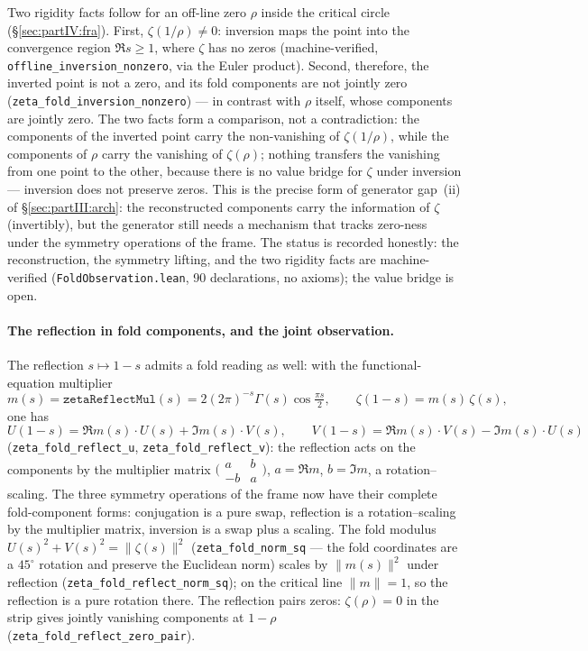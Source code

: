 \documentclass{article}
\newcommand{\zt}{\zeta}
\begin{document}
Two rigidity facts follow for an off-line zero $\rho$ inside the
critical circle (\S\ref{sec:partIV:fra}). First, $\zt(1/\rho)\ne 0$:
inversion maps the point into the convergence region $\Re s\ge1$,
where $\zt$ has no zeros (machine-verified,
\texttt{offline\_inversion\_nonzero}, via the Euler product). Second,
therefore, the inverted point is not a zero, and its fold components
are not jointly zero (\texttt{zeta\_fold\_inversion\_nonzero}) --- in
contrast with $\rho$ itself, whose components are jointly zero. The
two facts form a comparison, not a contradiction: the components of
the inverted point carry the non-vanishing of $\zt(1/\rho)$, while the
components of $\rho$ carry the vanishing of $\zt(\rho)$; nothing
transfers the vanishing from one point to the other, because there is
no value bridge for $\zt$ under inversion --- inversion does not
preserve zeros. This is the precise form of generator gap~(ii) of
\S\ref{sec:partIII:arch}: the reconstructed components carry the
information of $\zt$ (invertibly), but the generator still needs a
mechanism that tracks zero-ness under the symmetry operations of the
frame. The status is recorded honestly: the reconstruction, the
symmetry lifting, and the two rigidity facts are machine-verified
(\texttt{FoldObservation.lean}, 90 declarations, no axioms); the value
bridge is open.

\paragraph{The reflection in fold components, and the joint observation.}
The reflection $s\mapsto 1-s$ admits a fold reading as well: with the
functional-equation multiplier
\begin{equation}
  m(s)=\texttt{zetaReflectMul}(s)=2(2\pi)^{-s}\Gamma(s)\cos\tfrac{\pi s}{2},
  \qquad \zt(1-s)=m(s)\,\zt(s),
\end{equation}
one has
\begin{equation}
  U(1-s)=\Re m(s)\cdot U(s)+\Im m(s)\cdot V(s),\qquad
  V(1-s)=\Re m(s)\cdot V(s)-\Im m(s)\cdot U(s)
\end{equation}
(\texttt{zeta\_fold\_reflect\_u}, \texttt{zeta\_fold\_reflect\_v}): the
reflection acts on the components by the multiplier matrix
$\bigl(\begin{smallmatrix}a&b\\-b&a\end{smallmatrix}\bigr)$, $a=\Re m$,
$b=\Im m$, a rotation--scaling. The three symmetry operations of the
frame now have their complete fold-component forms: conjugation is a
pure swap, reflection is a rotation--scaling by the multiplier matrix,
inversion is a swap plus a scaling. The fold modulus
$U(s)^2+V(s)^2=\|\zt(s)\|^2$ (\texttt{zeta\_fold\_norm\_sq} --- the
fold coordinates are a $45^\circ$ rotation and preserve the Euclidean
norm) scales by $\|m(s)\|^2$ under reflection
(\texttt{zeta\_fold\_reflect\_norm\_sq}); on the critical line
$\|m\|=1$, so the reflection is a pure rotation there. The reflection
pairs zeros: $\zt(\rho)=0$ in the strip gives jointly vanishing
components at $1-\rho$ (\texttt{zeta\_fold\_reflect\_zero\_pair}).
\end{document}
